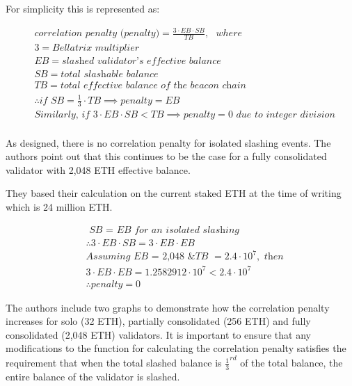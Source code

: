 \documentclass{article}
\begin{document}
For simplicity this is represented as:

\begin{equation*}
\begin{split}
& \textit{correlation penalty (penalty)} = \frac{3\cdot EB\cdot SB}{TB}, \texttt{ } where \\
& 3 = \textit{Bellatrix multiplier} \\
& EB = \textit{slashed validator's effective balance} \\
& SB = \textit{total slashable balance} \\
& TB = \textit{total effective balance of the beacon chain} \\
& \therefore \textit{if SB} = \frac{1}{3} \cdot  TB \implies penalty = EB \\
& \textit{Similarly, if } 3\cdot EB\cdot SB <  TB \implies penalty = 0 \textit{ due to integer division} \\
\end{split}
\end{equation*}

As designed, there is no correlation penalty for isolated slashing events. The
authors point out that this continues to be the case for a fully consolidated
validator with 2,048 ETH effective balance.

They based their calculation on the current staked ETH at the time of writing
which is 24 million ETH.

\begin{equation*}
\begin{split}
& \textit{ SB = EB for an isolated slashing} \\
& \therefore  3\cdot EB\cdot SB =  3\cdot EB\cdot EB \\
& \textit{Assuming EB = 2,048 \& TB } = 2.4 \cdot  10^7, \textit{ then} \\
& 3\cdot EB\cdot EB = 1.2582912 \cdot  10^7 < 2.4 \cdot  10^7 \\
& \therefore penalty = 0
\end{split}
\end{equation*}

The authors include two graphs to demonstrate how the correlation penalty
increases for solo (32 ETH), partially consolidated (256 ETH) and fully
consolidated (2,048 ETH) validators. It is important to ensure that any
modifications to the function for calculating the correlation penalty satisfies
the requirement that when the total slashed balance is $\frac{1}{3}^{rd}$ of
the total balance, the entire balance of the validator is slashed.
\end{document}
